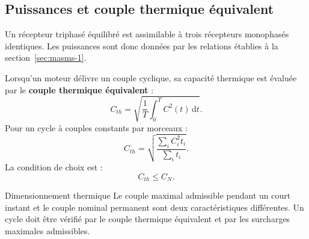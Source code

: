 \subsection{Puissances et couple thermique équivalent}

Un récepteur triphasé équilibré est assimilable à trois récepteurs monophasés identiques. Les puissances sont donc données par les relations établies à la section~\ref{sec:masms-1}.

Lorsqu'un moteur délivre un couple cyclique, sa capacité thermique est évaluée par le \textbf{couple thermique équivalent} :
\[
\boxed{C_{th}=\sqrt{\frac{1}{T}\int_0^T C^2(t)\,\mathrm dt}.}
\]
Pour un cycle à couples constants par morceaux :
\[
\boxed{C_{th}=\sqrt{\frac{\sum_i C_i^2t_i}{\sum_i t_i}}.}
\]
La condition de choix est :
\[
\boxed{C_{th}\leq C_N.}
\]


\begin{TLMachineWarning}{Dimensionnement thermique}
Le couple maximal admissible pendant un court instant et le couple nominal permanent sont deux caractéristiques différentes. Un cycle doit être vérifié par le couple thermique équivalent et par les surcharges maximales admissibles.
\end{TLMachineWarning}
